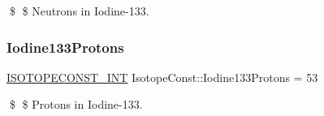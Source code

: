 \$ \$ Neutrons in Iodine-\/133. \mbox{\label{group___isotope_const-_iodine-_i133_gafa7657b80043009202f85c9344c05a13}} 
\subsubsection{\texorpdfstring{Iodine133\+Protons}{Iodine133Protons}}
{\footnotesize\ttfamily \mbox{\hyperlink{group___isotope_const-_macros_ga5f18360b3e99483a35c32d789e62621c}{I\+S\+O\+T\+O\+P\+E\+C\+O\+N\+S\+T\+\_\+\+I\+NT}} Isotope\+Const\+::\+Iodine133\+Protons = 53}

\$ \$ Protons in Iodine-\/133. 